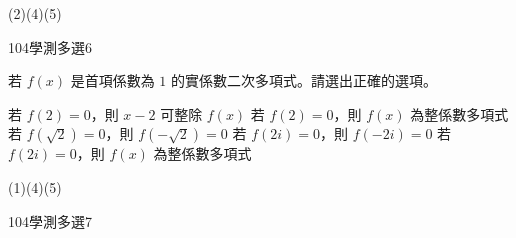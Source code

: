 \begin{QUESTIONS}
\begin{QUESTION}
        \begin{QANS}
            (2)(4)(5)
        \end{QANS}
        \begin{QSOLLIST}
        \end{QSOLLIST}
        \begin{QEMPTYSPACE}
        \end{QEMPTYSPACE}
    \end{QUESTION}
    \begin{QUESTION}
        \begin{ExamInfo}{104}{學測}{多選}{6}
        \end{ExamInfo}
        \begin{ExamAnsRateInfo}{45}{74}{43}{18}
        \end{ExamAnsRateInfo}
        \begin{QBODY}
            若 $f\left( x \right)$ 是首項係數為 $1$ 的實係數二次多項式。請選出正確的選項。
			\begin{QOPS}
				\QOP 若 $f\left( 2 \right)=0$，則 $x-2$ 可整除 $f\left( x \right)$
				\QOP 若 $f\left( 2 \right)=0$，則 $f\left( x \right)$ 為整係數多項式
				\QOP 若 $f\left( \sqrt{2} \right)=0$，則 $f\left( -\sqrt{2} \right)=0$
				\QOP 若 $f\left( 2i \right)=0$，則 $f\left( -2i \right)=0$
				\QOP 若 $f\left( 2i \right)=0$，則 $f\left( x \right)$ 為整係數多項式
			\end{QOPS}
        \end{QBODY}
        \begin{QFROMS}
        \end{QFROMS}
        \begin{QTAGS}\end{QTAGS}
        \begin{QANS}
            (1)(4)(5)
        \end{QANS}
        \begin{QSOLLIST}
        \end{QSOLLIST}
        \begin{QEMPTYSPACE}
        \end{QEMPTYSPACE}
    \end{QUESTION}
    \begin{QUESTION}
        \begin{ExamInfo}{104}{學測}{多選}{7}
        \end{ExamInfo}
        \begin{ExamAnsRateInfo}{67}{92}{77}{32}

\end{ExamAnsRateInfo}
\end{QUESTION}
\end{QUESTIONS}
